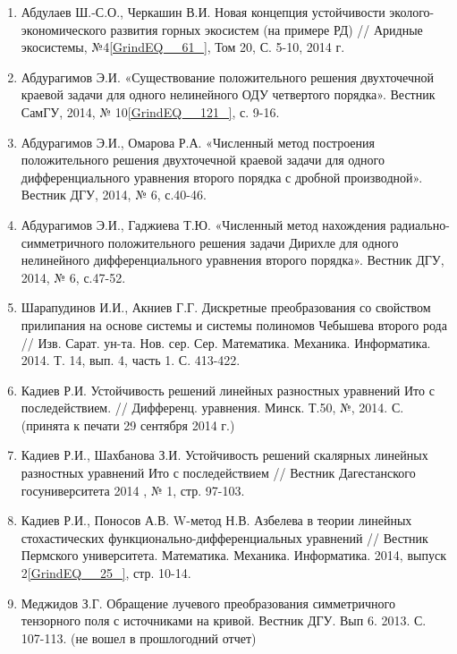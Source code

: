 \begin{enumerate}
\item  Абдулаев Ш.-С.О., Черкашин В.И. Новая концепция устойчивости эколого-экономического развития горных экосистем (на примере РД) // Аридные экосистемы, №4\eqref{GrindEQ__61_}, Том 20, С. 5-10, 2014 г.

\item  Абдурагимов Э.И. «Существование положительного решения двухточечной краевой задачи для одного нелинейного ОДУ четвертого порядка». Вестник СамГУ, 2014, № 10\eqref{GrindEQ__121_}, с. 9-16.

\item  Абдурагимов Э.И., Омарова Р.А. «Численный метод построения положительного решения двухточечной краевой задачи для одного дифференциального уравнения второго порядка с дробной производной». Вестник ДГУ, 2014, № 6, с.40-46.

\item  Абдурагимов Э.И., Гаджиева Т.Ю. «Численный метод нахождения радиально-симметричного положительного решения задачи Дирихле для одного нелинейного дифференциального уравнения второго порядка». Вестник ДГУ, 2014, № 6, с.47-52.

\item  Шарапудинов И.И., Акниев Г.Г. Дискретные преобразования со свойством прилипания на основе системы  и системы полиномов Чебышева второго рода // Изв. Сарат. ун-та. Нов. сер. Сер. Математика. Механика. Информатика. 2014. Т. 14, вып. 4, часть 1. С. 413-422.

\item  Кадиев Р.И. Устойчивость решений линейных разностных уравнений Ито с последействием. // Дифференц. уравнения. Минск. Т.50, №, 2014. С. (принята к печати 29 сентября 2014 г.)

\item  Кадиев Р.И., Шахбанова З.И. Устойчивость решений скалярных линейных разностных уравнений Ито с последействием // Вестник Дагестанского госуниверситета 2014 , № 1, стр. 97-103.

\item  Кадиев Р.И., Поносов А.В. W-метод Н.В. Азбелева в теории линейных стохастических функционально-дифференциальных уравнений // Вестник Пермского университета. Математика. Механика. Информатика. 2014, выпуск 2\eqref{GrindEQ__25_}, стр. 10-14.

\item  Меджидов З.Г. Обращение лучевого преобразования симметричного тензорного поля с источниками на кривой. Вестник ДГУ. Вып 6. 2013. С. 107-113. (не вошел в прошлогодний отчет)


\end{enumerate}
